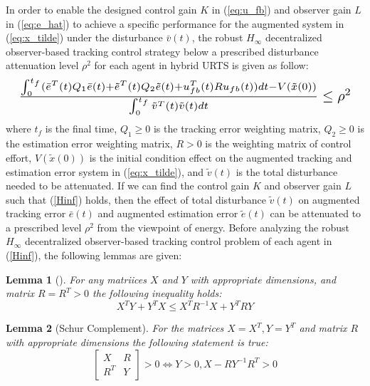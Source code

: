 \documentclass{ieeeaccess}
\newtheorem{lemma}{Lemma}
\begin{document}
In order to enable the designed control gain $K$ in (\ref{eq:u_fb}) and observer gain $L$ in (\ref{eq:e_hat}) to achieve a specific performance for the augmented system in (\ref{eq:x_tilde}) under the disturbance $\bar{v}(t)$, the robust $H_\infty$ decentralized observer-based tracking control strategy below a prescribed disturbance attenuation level $\rho^2$ for each agent in hybrid URTS is given as follow:
\begin{equation} \label{Hinf}
    \resizebox{1\hsize}{!}{    
        $\frac{\int_{0}^{t_f}(\bar{e}^T(t)Q_1\bar{e}(t) + \tilde{e}^T(t)Q_2\tilde{e}(t) + u_{fb}^T(t)Ru_{fb}(t))dt - V(\tilde{x}(0))}{\int_{0}^{t_f}\tilde{v}^T(t)\tilde{v}(t)dt}\leq \rho^2$
    }
\end{equation}
where $t_f$ is the final time, $Q_1 \geq 0$ is the tracking error weighting matrix, $Q_2 \geq 0$ is the estimation error weighting matrix, $R > 0$ is the weighting matrix of control effort, $V(\tilde{x}(0))$ is the initial condition effect on the augmented tracking and estimation error system in (\ref{eq:x_tilde}), and $\tilde{v}(t)$ is the total disturbance needed to be attenuated. If we can find the control gain $K$ and observer gain $L$ such that (\ref{Hinf}) holds, then the effect of total disturbance $\tilde{v}(t)$ on augmented tracking error $\bar{e}(t)$ and augmented estimation error $\tilde{e}(t)$ can be attenuated to a prescribed level $\rho^2$ from the viewpoint of energy. Before analyzing the robust $H_\infty$ decentralized observer-based tracking control problem of each agent in (\ref{Hinf}), the following lemmas are given:
\begin{lemma}[\cite{boyd1994linear}] \label{lemma1}
    For any matriices $X$ and $Y$ with appropriate dimensions, and matrix $R=R^T>0$ the following inequality holds:
    \begin{equation} \label{}
        X^T Y + Y^T X \leq X^T R^{-1}X + Y^T R Y
    \end{equation}  
\end{lemma}
\begin{lemma}[Schur Complement\cite{boyd1994linear}] \label{lemma2}
    For the matrices $X=X^T,Y=Y^T$ and matrix $R$ with appropriate dimensions the following statement is true:
    \begin{equation} \label{}
        \begin{bmatrix}
            X & R \\ R^T & Y 
        \end{bmatrix} > 0 \Leftrightarrow Y>0, X-RY^{-1}R^T>0
    \end{equation}
\end{lemma}
\end{document}
